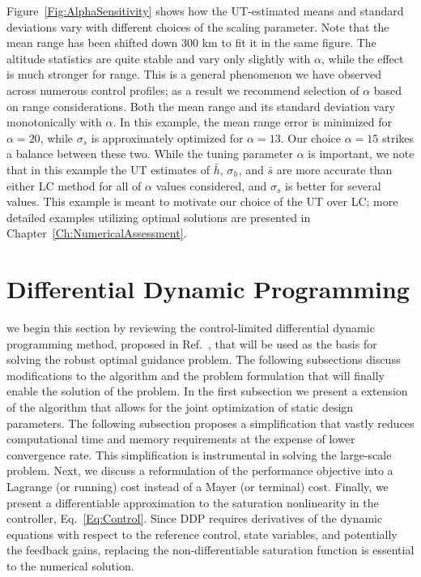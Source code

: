Figure~\ref{Fig:AlphaSensitivity} shows how the UT-estimated means and standard deviations vary with different choices of the scaling parameter. Note that the mean range has been shifted down 300 km to fit it in the same figure. The altitude statistics are quite stable and vary only slightly with $\alpha$, while the effect is much stronger for range. This is a general phenomenon we have observed across numerous control profiles; as a result we recommend selection of $\alpha$ based on range considerations. 
Both the mean range and its standard deviation vary monotonically with $\alpha$. In this example, the mean range error is minimized for $\alpha = 20$, while $\sigma_s$ is approximately optimized for $\alpha = 13$. Our choice $\alpha=15$ strikes a balance between these two. 
While the tuning parameter $\alpha$ is important, we note that in this example the UT estimates of $\bar{h},\,\sigma_h$, and $\bar{s}$ are more accurate than either LC method for all of $\alpha$ values considered, and $\sigma_s$ is better for several values.
This example is meant to motivate our choice of the UT over LC; more detailed examples utilizing optimal solutions are presented in Chapter~\ref{Ch:NumericalAssessment}. 


\section{Differential Dynamic Programming}\label{Sec:DDP}
we begin this section by reviewing the control-limited differential dynamic programming method, proposed in Ref.~\cite{DDP_ControlLimited}, that will be used as the basis for solving the robust optimal guidance problem. The following subsections discuss modifications to the algorithm and the problem formulation that will finally enable the solution of the problem. In the first subsection we present a extension of the algorithm that allows for the joint optimization of static design parameters. The following subsection proposes a simplification that vastly reduces computational time and memory requirements at the expense of lower convergence rate. This simplification is instrumental in solving the large-scale problem. Next, we discuss a reformulation of the performance objective into a Lagrange (or running) cost instead of a Mayer (or terminal) cost. Finally, we present a differentiable approximation to the saturation nonlinearity in the controller, Eq.~\eqref{Eq:Control}. Since DDP requires derivatives of the dynamic equations with respect to the reference control, state variables, and potentially the feedback gains, replacing the non-differentiable saturation function is essential to the numerical solution.

